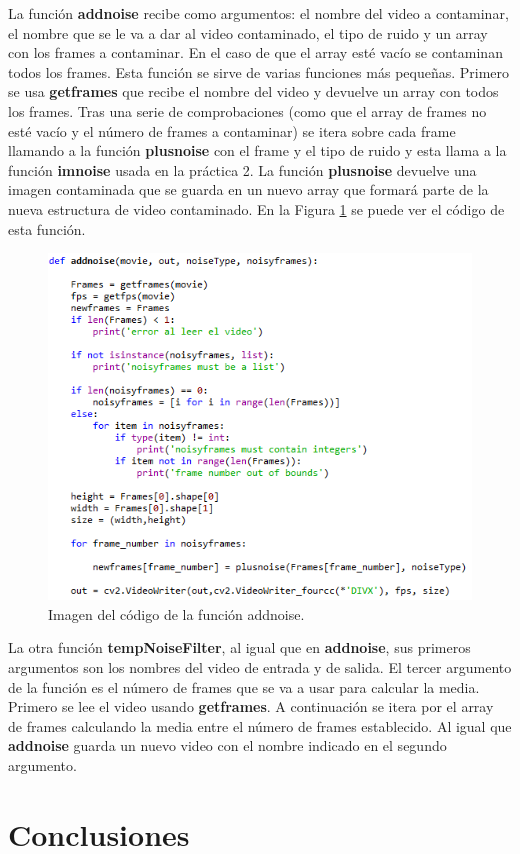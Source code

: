 \documentclass[a4paper,12pt]{report}
\begin{document}
La función \textbf{addnoise} recibe como argumentos: el nombre del video a contaminar, el nombre que se le va a dar al video contaminado, el tipo de ruido y un array con los frames a contaminar. En el caso de que el array esté vacío se contaminan todos los frames. Esta función se sirve de varias funciones más pequeñas. Primero se usa \textbf{getframes} que recibe el nombre del video y devuelve un array con todos los frames. Tras una serie de comprobaciones (como que el array de frames no esté vacío y el número de frames a contaminar) se itera sobre cada frame llamando a la función \textbf{plusnoise} con el frame y el tipo de ruido y esta llama a la función \textbf{imnoise} usada en la práctica 2. La función \textbf{plusnoise} devuelve una imagen contaminada que se guarda en un nuevo array que formará parte de la nueva estructura de video contaminado. En la Figura \ref{addnoise} se puede ver el código de esta función.\\

\begin{figure}[h]
\centering
\includegraphics[width=1.0\textwidth]{imagenes/addnoise}
\caption{Imagen del código de la función addnoise.}
\label{addnoise} 
\end{figure}

La otra función \textbf{tempNoiseFilter}, al igual que en \textbf{addnoise}, sus primeros argumentos son los nombres del video de entrada y de salida. El tercer argumento de la función es el número de frames que se va a usar para calcular la media. Primero se lee el video usando \textbf{getframes}. A continuación se itera por el array de frames calculando la media entre el número de frames establecido. Al igual que \textbf{addnoise} guarda un nuevo video con el nombre indicado en el segundo argumento.\\


\chapter{Conclusiones}

\nocite{*}
\printbibliography[heading=bibintoc,title={Bibliography}]
\end{document}
